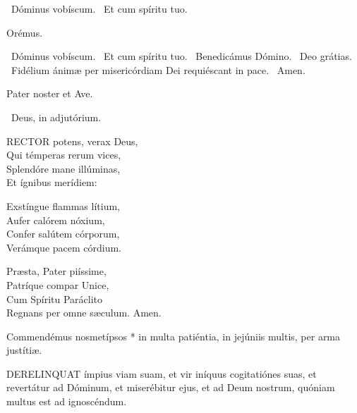 \V\ Dóminus vobíscum. \R\ Et cum spíritu tuo.

Orémus.



\V\ Dóminus vobíscum. \R\ Et cum spíritu tuo. \V\ Benedicámus Dómino. \R\ Deo grátias. \V\ Fidélium ánimæ per misericórdiam Dei requiéscant in pace. \R\ Amen.



Pater noster et Ave.

\V\ Deus, in adjutórium.


\lettrine[lines=2]{R}{ECTOR} potens, verax Deus,\\
Qui témperas rerum vices,\\
Splendóre mane illúminas,\\
Et ígnibus merídiem:

Exstíngue flammas lítium,\\
Aufer calórem nóxium,\\
Confer salútem córporum,\\
Verámque pacem córdium.

Præsta, Pater piíssime,\\
Patríque compar Unice,\\
Cum Spíritu Paráclito\\
Regnans per omne sæculum. Amen.





 Commendémus nosmetípsos * in multa patiéntia, in jejúniis multis, per arma justítiæ.


\lettrine[lines=2]{D}{ERELINQUAT} ímpius viam suam, et vir iníquus cogitatiónes suas, et revertátur ad Dóminum, et miserébitur ejus, et ad Deum nostrum, quóniam multus est ad ignoscéndum.

